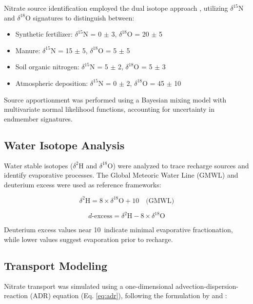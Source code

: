 \documentclass[12pt,a4paper]{article}
\begin{document}
Nitrate source identification employed the dual isotope approach \citep{Kendall1998, Xue2009}, utilizing $\delta^{15}$N and $\delta^{18}$O signatures to distinguish between:
\begin{itemize}
	\item Synthetic fertilizer: $\delta^{15}$N = 0 $\pm$ 3\textperthousand, $\delta^{18}$O = 20 $\pm$ 5\textperthousand
	\item Manure: $\delta^{15}$N = 15 $\pm$ 5\textperthousand, $\delta^{18}$O = 5 $\pm$ 5\textperthousand
	\item Soil organic nitrogen: $\delta^{15}$N = 5 $\pm$ 2\textperthousand, $\delta^{18}$O = 5 $\pm$ 3\textperthousand
	\item Atmospheric deposition: $\delta^{15}$N = 0 $\pm$ 2\textperthousand, $\delta^{18}$O = 45 $\pm$ 10\textperthousand
\end{itemize}

Source apportionment was performed using a Bayesian mixing model with multivariate normal likelihood functions, accounting for uncertainty in endmember signatures.

\subsection{Water Isotope Analysis}

Water stable isotopes ($\delta^{2}$H and $\delta^{18}$O) were analyzed to trace recharge sources and identify evaporative processes. The Global Meteoric Water Line (GMWL) \citep{Craig1961} and deuterium excess \citep{Dansgaard1964} were used as reference frameworks:

\begin{equation}
\delta^{2}\text{H} = 8 \times \delta^{18}\text{O} + 10 \quad \text{(GMWL)}
\label{eq:gmwl}
\end{equation}

\begin{equation}
d\text{-excess} = \delta^{2}\text{H} - 8 \times \delta^{18}\text{O}
\label{eq:dex}
\end{equation}

Deuterium excess values near 10\textperthousand\ indicate minimal evaporative fractionation, while lower values suggest evaporation prior to recharge.

\subsection{Transport Modeling}

Nitrate transport was simulated using a one-dimensional advection-dispersion-reaction (ADR) equation (Eq. \ref{eq:adr}), following the formulation by \citet{Bear1979} and \citet{Zheng2002}:
\end{document}
